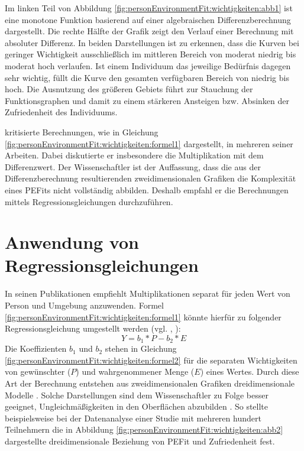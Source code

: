 Im linken Teil von Abbildung \ref{fig:personEnvironmentFit:wichtigkeiten:abb1} ist eine monotone Funktion basierend auf einer algebraischen Differenzberechnung dargestellt. Die rechte Hälfte der Grafik zeigt den Verlauf einer Berechnung mit absoluter Differenz. In beiden Darstellungen ist zu erkennen, dass die Kurven bei geringer Wichtigkeit ausschließlich im mittleren Bereich von moderat niedrig bis moderat hoch verlaufen. Ist einem Individuum das jeweilige Bedürfnis dagegen sehr wichtig, füllt die Kurve den gesamten verfügbaren Bereich von niedrig bis hoch. Die Ausnutzung des größeren Gebiets führt zur Stauchung der Funktionsgraphen und damit zu einem stärkeren Ansteigen bzw. Absinken der Zufriedenheit des Individuums. 

\textcite[S. 51ff.]{edwards:1991}\cite[S. 9ff.]{edwards:1990}\cite[S. 2ff.]{edwards:1993}\cite[S. 2ff.]{edwards:1993b} kritisierte Berechnungen, wie in Gleichung \ref{fig:personEnvironmentFit:wichtigkeiten:formel1} dargestellt, in mehreren seiner Arbeiten. Dabei diskutierte er insbesondere die Multiplikation mit dem Differenzwert. Der Wissenschaftler ist der Auffassung, dass die aus der Differenzberechnung resultierenden zweidimensionalen Grafiken die Komplexität eines \acp{PEFit} nicht vollständig abbilden. Deshalb empfahl er die Berechnungen mittels Regressionsgleichungen durchzuführen.

\section{Anwendung von Regressionsgleichungen}
\label{ch:personEnvironmentFit:regressionsgleichungen}
In seinen Publikationen empfiehlt \textcite[S. 51ff.]{edwards:1991}\cite[S. 9ff.]{edwards:1990}\cite[S. 2ff.]{edwards:1993}\cite[S. 2ff.]{edwards:1993b} Multiplikationen separat für jeden Wert von Person und Umgebung anzuwenden. Formel \ref{fig:personEnvironmentFit:wichtigkeiten:formel1} könnte hierfür zu folgender Regressionsgleichung umgestellt werden (vgl. \cite[S. 9f.]{edwards:1990}, \cite[S. 2f.]{edwards:1993b}):
\begin{equation}
	Y = b_1 * P - b_2 * E
	\label{fig:personEnvironmentFit:wichtigkeiten:formel2}
\end{equation}
Die Koeffizienten $b_1$ und $b_2$ stehen in Gleichung \ref{fig:personEnvironmentFit:wichtigkeiten:formel2} für die separaten Wichtigkeiten von gewünschter ($P$) und wahrgenommener Menge ($E$) eines Wertes. Durch diese Art der Berechnung entstehen aus zweidimensionalen Grafiken dreidimensionale Modelle \cite[S. 2]{edwards:1993}. Solche Darstellungen sind dem Wissenschaftler zu Folge besser geeignet, Ungleichmäßigkeiten in den Oberflächen abzubilden \cite[S. 51ff.]{edwards:1991}. So stellte \textcite[S. 53ff.]{edwards:1991} beispielsweise bei der Datenanalyse einer Studie mit mehreren hundert Teilnehmern die in Abbildung \ref{fig:personEnvironmentFit:wichtigkeiten:abb2} dargestellte dreidimensionale Beziehung von \ac{PEFit} und Zufriedenheit fest.

